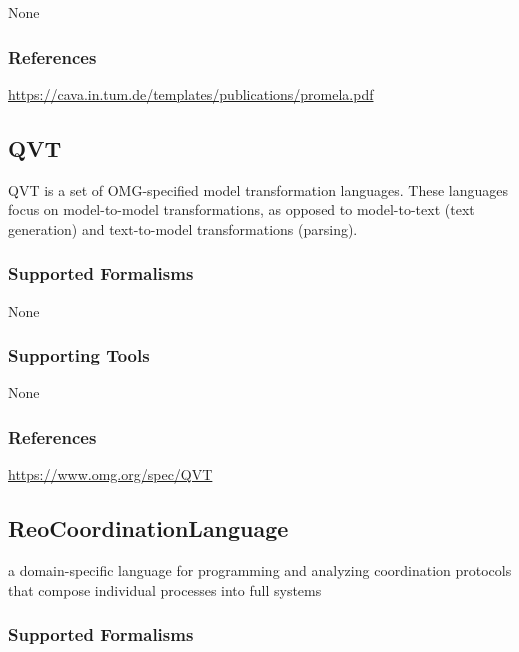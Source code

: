 None


\subsubsection{References}

\url{https://cava.in.tum.de/templates/publications/promela.pdf}




\subsection{QVT}
\label{subsecL:QVT}


QVT is a set of OMG-specified model transformation languages.
These languages focus on model-to-model transformations, as opposed to model-to-text (text generation) and text-to-model transformations (parsing).


\subsubsection{Supported Formalisms}

None


\subsubsection{Supporting Tools}

None


\subsubsection{References}

\url{https://www.omg.org/spec/QVT}




\subsection{Reo\textunderscore Coordination\textunderscore Language}
\label{subsecL:Reo_Coordination_Language}


a domain-specific language for programming and analyzing coordination protocols that compose individual processes into full systems

\subsubsection{Supported Formalisms}

